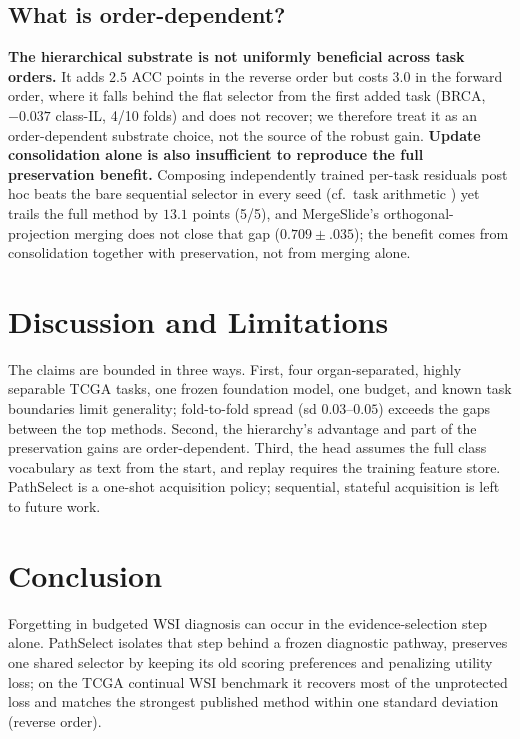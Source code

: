 \documentclass{article}
\begin{document}
\subsection{What is order-dependent?}
\label{ssec:order}

\textbf{The hierarchical substrate is not uniformly beneficial across task orders.} It adds $2.5$ ACC points in the reverse order but costs $3.0$ in the forward order, where it falls behind the flat selector from the first added task (BRCA, $-0.037$ class-IL, 4/10 folds) and does not recover; we therefore treat it as an order-dependent substrate choice, not the source of the robust gain. \textbf{Update consolidation alone is also insufficient to reproduce the full preservation benefit.} Composing independently trained per-task residuals post hoc beats the bare sequential selector in every seed (cf.\ task arithmetic \cite{ilharco2023task}) yet trails the full method by $13.1$ points (5/5), and MergeSlide's orthogonal-projection merging \cite{bui2026mergeslide} does not close that gap ($0.709{\pm}.035$); the benefit comes from consolidation together with preservation, not from merging alone.

\FloatBarrier
\section{Discussion and Limitations}
\label{sec:discussion}

The claims are bounded in three ways. First, four organ-separated, highly separable TCGA tasks, one frozen foundation model, one budget, and known task boundaries limit generality; fold-to-fold spread (sd $0.03$--$0.05$) exceeds the gaps between the top methods. Second, the hierarchy's advantage and part of the preservation gains are order-dependent. Third, the head assumes the full class vocabulary as text from the start, and replay requires the training feature store. PathSelect is a one-shot acquisition policy; sequential, stateful acquisition is left to future work.

\section{Conclusion}

Forgetting in budgeted WSI diagnosis can occur in the evidence-selection step alone. PathSelect isolates that step behind a frozen diagnostic pathway, preserves one shared selector by keeping its old scoring preferences and penalizing utility loss; on the TCGA continual WSI benchmark it recovers most of the unprotected loss and matches the strongest published method within one standard deviation (reverse order).
\end{document}
